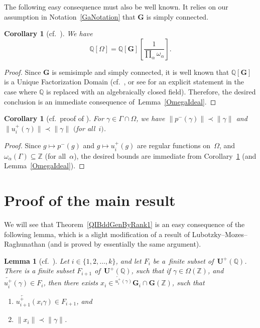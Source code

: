 \documentclass[11pt]{article}
\numberwithin{equation}{section}
\newcommand{\QQ}{\mathbb{Q}}
\newcommand{\ZZ}{\mathbb{Z}}
\newcommand{\Ga}{\mathbf{G}}
\newcommand{\Ua}{\mathbf{U}}
\newcommand{\la}{\overleftarrow}
\numberwithin{equation}{section}
\newtheorem{lem}[thm]{Lemma}
\newtheorem{cor}[thm]{Corollary}
\theoremstyle{definition}
\begin{document}
The following easy consequence must also be well known.
It relies on our assumption in Notation~\ref{GaNotation} that $\Ga$ is simply connected.

\begin{cor}[cf.\ {\cite[Lemma~4.11(ii)]{MR1828742}}] \label{F[Omega]}
We have
	\[\QQ[\Omega] = \QQ[\Ga] \left[ \frac{1}{\prod_\alpha \omega_\alpha} \right] .\]
\end{cor}

\begin{proof}
Since $\Ga$ is semisimple and simply connected, it is well known that $\QQ[\Ga]$ is a Unique Factorization Domain (cf.\ \cite[Proposition~3.4]{Rosengarten-Picard}, or see \cite[Corollary~on p.~303]{Popov-Picard} for an explicit statement in the case where $\QQ$ is replaced with an algebraically closed field). Therefore, the desired conclusion is an immediate consequence of~Lemma~\ref{OmegaIdeal}.
\end{proof}

\begin{cor}[cf.\ proof of {\cite[Lemma~4.11(iii)]{MR1828742}}] \label{ubdd}
For $\gamma \in \Gamma \cap \Omega$, we have $\| p^-(\gamma) \| \prec \| \gamma \|$
and $\|u^+_i(\gamma) \| \prec \| \gamma \|$ $($for all~$i)$.
\end{cor}

\begin{proof}Since $g \mapsto p^-(g)$ and $g \mapsto u^+_i(g)$ are regular functions on~$\Omega$, and $\omega_\alpha(\Gamma) \subseteq \ZZ$ (for all~$\alpha$), the desired bounds are immediate from Corollary~\ref{F[Omega]} (and Lemma~\ref{OmegaIdeal}).
\end{proof}

\section{Proof of the main result} \label{MainProofSect}

We will see that Theorem~\ref{QIBddGenByRank1} is an easy consequence of the following lemma, which is a slight modification of a result of Lubotzky--Mozes--Raghunathan (and is proved by essentially the same argument).

\begin{lem}[cf.\ {\cite[paragraphs~4.19, 4.21, and 4.22]{MR1828742}}] \label{OneStep}
Let $i \in \{1,2,\ldots,k\}$, and let $F_i$ be a~finite subset of~$\Ua^+(\QQ)$.
There is a finite subset $F_{i+1}$ of~$\Ua^+(\QQ)$, such that if $\gamma \in \Omega(\ZZ)$, and $\la{u^+_i}(\gamma) \in F_i$, then there exists $x_i \in {}^{\la{u^+_i}(\gamma)}\Ga_i \cap \Ga(\ZZ)$, such that
\begin{enumerate}\itemsep=0pt
\item[$1)$] %
	$\la{u^+_{i+1}}(x_i \gamma) \in F_{i+1}$, and
\item[$2)$] %
	$\| x_i \| \prec \| \gamma \|$.
\end{enumerate}
\end{lem}
\end{document}
